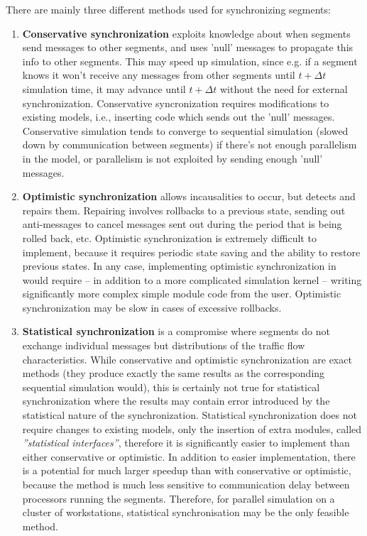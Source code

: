 There are mainly three different methods used for synchronizing
segments:
\begin{enumerate}
  \item{\textbf{Conservative synchronization} exploits knowledge about when segments send
    messages to other segments, and uses 'null' messages to propagate
    this info to other segments. This may speed up simulation, since
    e.g. if a segment knows it won't receive any messages from other
    segments until $t+\Delta t$ simulation time, it may advance until
    $t+\Delta t$ without the need for external synchronization.
    Conservative syncronization requires modifications to existing
    models, i.e., inserting code which sends out the 'null' messages.
    Conservative simulation tends to converge to sequential simulation
    (slowed down by communication between segments) if there's not
    enough parallelism in the model, or parallelism is not exploited
    by sending enough 'null' messages.}

  \item{\textbf{Optimistic synchronization} allows incausalities to occur, but detects and
    repairs them. Repairing involves rollbacks to a previous state,
    sending out anti-messages to cancel messages sent out during the
    period that is being rolled back, etc.  Optimistic synchronization
    is extremely difficult to implement, because it requires periodic
    state saving and the ability to restore previous states. In any
    case, implementing optimistic synchronization in {\opp} would
    require -- in addition to a more complicated simulation kernel --
    writing significantly more complex simple
    module code from the user.  Optimistic synchronization may be slow
    in cases of excessive rollbacks.}

  \item{\textbf{Statistical synchronization} is a compromise where segments do not exchange
    individual messages but distributions of the traffic flow
    characteristics. While conservative and optimistic synchronization
    are exact methods (they produce exactly the same results as the
    corresponding sequential simulation would), this is certainly not
    true for statistical synchronization where the results may contain
    error introduced by the statistical nature of the synchronization.
    Statistical synchronization does not require changes to existing
    models, only the insertion of extra modules, called
    \textit{''statistical interfaces''}, therefore it is significantly
    easier to implement than either conservative or optimistic. In
    addition to easier implementation, there is a potential for much
    larger speedup than with conservative or optimistic, because the
    method is much less sensitive to communication delay between
    processors running the segments. Therefore, for parallel
    simulation on a cluster of workstations, statistical
    synchronisation may be the only feasible method.}
\end{enumerate}





